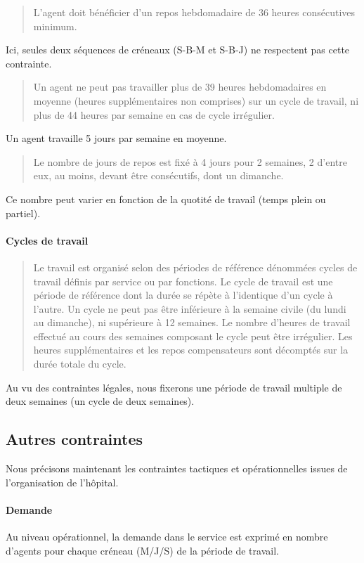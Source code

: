 \documentclass[a4paper]{article}       %
\begin{document}
\begin{quote}
  L'agent doit bénéficier d'un repos hebdomadaire de 36 heures consécutives minimum.
\end{quote}
Ici, seules deux séquences de créneaux (S-B-M et S-B-J) ne respectent pas cette contrainte.

\begin{quote}
  Un agent ne peut pas travailler plus de 39 heures hebdomadaires en moyenne (heures supplémentaires non comprises) sur un cycle de travail, ni plus de 44 heures par semaine en cas de cycle irrégulier.
\end{quote}
Un agent travaille 5 jours par semaine en moyenne.


\begin{quote}
  Le nombre de jours de repos est fixé à 4 jours pour 2 semaines, 2 d'entre eux, au moins, devant être consécutifs, dont un dimanche.
\end{quote}
Ce nombre peut varier en fonction de la quotité de travail (temps plein ou partiel).

\paragraph{Cycles de travail}

\begin{quote}
Le travail est organisé selon des périodes de référence dénommées cycles de travail définis par service ou par fonctions.
Le cycle de travail est une période de référence dont la durée se répète à l'identique d'un cycle à l'autre. 
Un cycle ne peut pas être inférieure à la semaine civile (du lundi au dimanche), ni supérieure à 12 semaines. 
Le nombre d'heures de travail effectué au cours des semaines composant le cycle peut être irrégulier. 
Les heures supplémentaires et les repos compensateurs sont décomptés sur la durée totale du cycle. 
\end{quote}

Au vu des contraintes légales, nous fixerons une période de travail multiple de deux semaines (un cycle de deux semaines).

\subsection{Autres contraintes}

Nous précisons maintenant les contraintes tactiques et opérationnelles issues de l'organisation de l'hôpital.

\paragraph{Demande}
Au niveau opérationnel, la demande dans le service est exprimé en nombre d'agents pour chaque créneau (M/J/S) de la période de travail.
\end{document}

